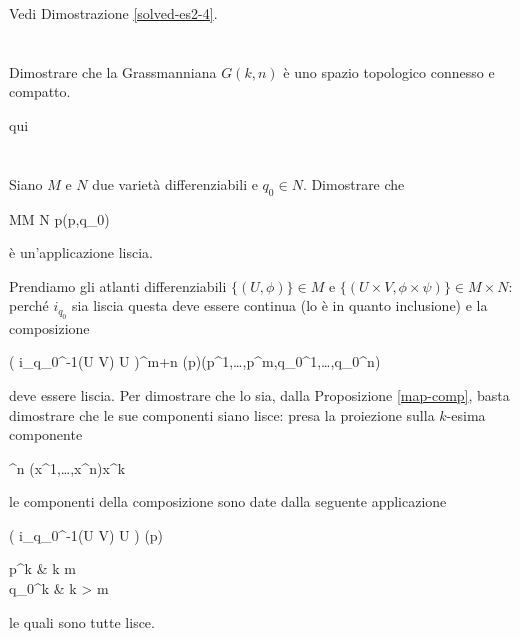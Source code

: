 Vedi Dimostrazione \ref{solved-es2-4}.

\tocless\section{}\label{es2-5}

\begin{tcolorbox}
	Dimostrare che la Grassmanniana $ G(k,n) $ è uno spazio topologico connesso e compatto.
\end{tcolorbox}

qui

\tocless\section{}\label{es2-6}

\begin{tcolorbox}
	Siano $ M $ e $ N $ due varietà differenziabili e $ q_{0} \in N $. Dimostrare che
	
		{M}{M \times N}%
		{p}{(p,q_{0})}
	
	è un'applicazione liscia.
\end{tcolorbox}

Prendiamo gli atlanti differenziabili $ \{(U,\phi)\} \in M $ e $ \{(U \times V,\phi \times \psi)\} \in M \times N $: perché $ i_{q_{0}} $ sia liscia questa deve essere continua (lo è in quanto inclusione) e la composizione

%
	{\phi( i_{q_{0}}^{-1}(U \times V) \cap U )}{\R^{m+n}}%
	{\phi(p)}{(p^{1},\dots,p^{m},q_{0}^{1},\dots,q_{0}^{n})}

deve essere liscia. Per dimostrare che lo sia, dalla Proposizione \ref{map-comp}, basta dimostrare che le sue componenti siano lisce: presa la proiezione sulla $ k $-esima componente

%
	{\R^{n}}{\R}%
	{(x^{1},\dots,x^{n})}{x^{k}}
	
le componenti della composizione sono date dalla seguente applicazione

%
	{\phi( i_{q_{0}}^{-1}(U \times V) \cap U )}{\R}%
	{\phi(p)}{%
		\begin{cases}
			p^{k} & k \leqslant m\\
			q_{0}^{k} & k > m
		\end{cases}%
	}

le quali sono tutte lisce.

\tocless\section{}\label{es2-7}

